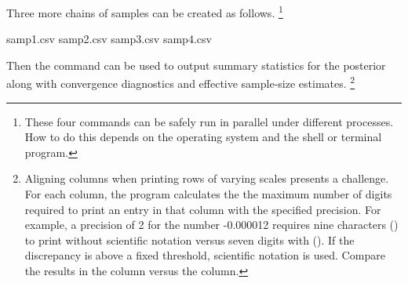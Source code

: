 \documentclass[article]{jss}
\begin{document}
Three more chains of samples can be created as follows.%
%
\footnote{These four commands can be safely run in parallel under
  different processes.  How to do this depends on the operating system
  and the shell or terminal program.}
%
\begin{CodeChunk}
\begin{CodeOutput}
samp1.csv	samp2.csv	samp3.csv	samp4.csv
\end{CodeOutput}
\end{CodeChunk}
%
Then the  command can be used to output summary
statistics for the posterior along with convergence diagnostics and
effective sample-size estimates.%
%
\footnote{Aligning columns when printing rows of varying scales
  presents a challenge.  For each column, the program calculates the
  the maximum number of digits required to print an entry in that
  column with the specified precision. For example, a precision of 2
  for the number -0.000012 requires nine characters ()
  to print without scientific notation versus seven digits with
  ().  If the discrepancy is above a fixed threshold,
  scientific notation is used.  Compare the results in the 
  column versus the  column.}
%
\end{document}
